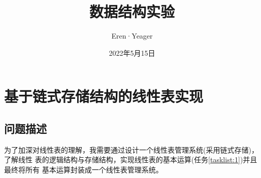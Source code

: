 \documentclass[supercite]{Experimental_Report}
\title{~~~~~~数据结构实验~~~~~~}
\author{Eren·Yeager}
\date{2022年5月15日}
\theoremstyle{definition}
\begin{document}
\maketitle

\clearpage


\tableofcontents[level=2]

\clearpage


\section{基于链式存储结构的线性表实现}

\subsection{问题描述}
	为了加深对线性表的理解，我需要通过设计一个线性表管理系统(采用链式存储)，了解线性
	表的逻辑结构与存储结构，实现线性表的基本运算(任务\ref{tasklist:1})并且最终将所有
	基本运算封装成一个线性表管理系统。
\end{document}
